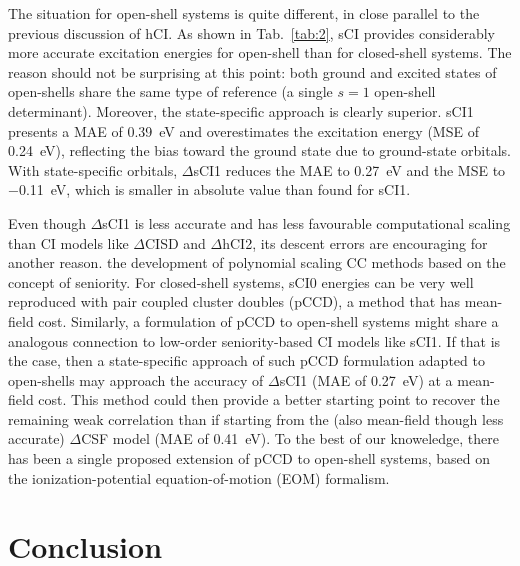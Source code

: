 \documentclass[aip,jcp,reprint,noshowkeys,superscriptaddress]{revtex4-1}
\begin{document}
The situation for open-shell systems is quite different, in close parallel to the previous discussion of hCI.
As shown in Tab.~\ref{tab:2}, sCI provides considerably more accurate excitation energies for open-shell than for closed-shell systems.
The reason should not be surprising at this point:
both ground and excited states of open-shells share the same type of reference (a single $s=1$ open-shell determinant).
Moreover, the state-specific approach is clearly superior.
sCI1 presents a MAE of \SI{0.39}{\eV} and overestimates the excitation energy (MSE of \SI{+0.24}{\eV}), reflecting the bias toward the ground state due to ground-state orbitals.
With state-specific orbitals, $\Delta$sCI1 reduces the MAE to \SI{0.27}{\eV} and the MSE to \SI{-0.11}{\eV}, which is smaller in absolute value than found for sCI1.

Even though $\Delta$sCI1 is less accurate and has less favourable computational scaling than CI models like $\Delta$CISD and $\Delta$hCI2,
its descent errors are encouraging for another reason.
the development of polynomial scaling CC methods based on the concept of seniority.
For closed-shell systems, sCI0 energies can be very well reproduced with pair coupled cluster doubles (pCCD), \cite{Kossoski_2021} a method that has mean-field cost.
Similarly, a formulation of pCCD to open-shell systems might share a analogous connection to low-order seniority-based CI models like sCI1.
If that is the case, then a state-specific approach of such pCCD formulation adapted to open-shells may approach the accuracy of $\Delta$sCI1 (MAE of \SI{0.27}{\eV}) at a mean-field cost.
This method could then provide a better starting point to recover the remaining weak correlation than if starting from the (also mean-field though less accurate) $\Delta$CSF model (MAE of \SI{0.41}{\eV}).
To the best of our knoweledge, there has been a single proposed extension of pCCD to open-shell systems, \cite{Boguslawski_2021}
based on the ionization-potential equation-of-motion (EOM) formalism.



\section{Conclusion}
\label{sec:ccl}

\end{document}
